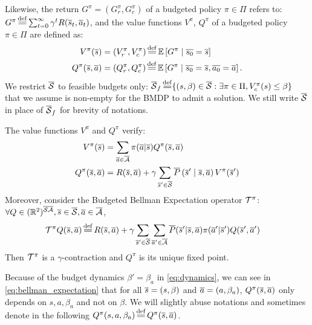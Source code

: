 Likewise, the return $G^\pi = (G_r^\pi, G_c^\pi)$ of a budgeted policy $\pi\in\Pi$ refers to:
$G^\pi \eqdef \sum_{t=0}^\infty \gamma^t R(\os_t, \oa_t)$,
and the value functions $V^\pi$, $Q^\pi$ of a budgeted policy $\pi\in\Pi$ are defined as:
\begin{align}
\label{eq:value-function}
V^\pi(\os) &= (V_r^\pi, V_c^\pi) \eqdef \expectedvalue\left[ G^\pi \condbar \ov{s_0} = \os\right]\\ Q^\pi(\os, \oa)&= (Q_r^\pi, Q_c^\pi) \eqdef \expectedvalue\left[ G^\pi \condbar \ov{s_0} = \os, \ov{a_0} = \oa\right].
\end{align}
We restrict $\overline{\mathcal{S}}$ to feasible budgets only: $\ocS_f \eqdef \{(s,\beta)\in\ocS: \exists \pi\in\Pi, V_c^\pi(s) \leq \beta\}$ that we assume is non-empty for the BMDP to admit a solution. We still write $\overline{\mathcal{S}}$ in place of $\overline{\mathcal{S}}_f$ for brevity of notations.

\begin{proposition}
	\begin{leftbar}[propositionbar]
	\label{prop:bellman-expectation}
	The value functions $V^\pi$ and $ Q^\pi$ verify:
	\begin{align}
	V^\pi(\overline{s}) &= \sum_{\overline{a}\in\overline{\mathcal{A}}}\pi(\overline{a} | \overline{s}) Q^\pi(\overline{s}, \overline{a}) \\ Q^\pi(\overline{s}, \overline{a}) &= R(\overline{s}, \overline{a}) + \gamma\sum_{\overline{s}'\in\overline{\mathcal{S}}}\overline{P}\left(\overline{s}' \;\middle|\; \overline{s}, \overline{a}\right) V^\pi(\overline{s}') \label{eq:bellman_expectation}
	\end{align}
	Moreover, consider the Budgeted Bellman Expectation operator $\mathcal{T}^\pi$:
	$\forall Q\in(\mathbb{R}^2)^{\overline{\mathcal{S}}\overline{\mathcal{A}}}, \overline{s}\in\overline{\mathcal{S}}, \overline{a}\in\overline{\mathcal{A}}$,
	\begin{align}
	\label{eq:bellman_expectation_operator}
	\cT^\pi Q(\os, \oa) &\eqdef R(\os, \oa) + \gamma \sum_{\os'\in\ocS}\sum_{\oa'\in\ocA}\ov{P}(\os'|\os, \oa)\pi(\oa'|\os') Q(\os', \oa')
	\end{align}
	Then $\mathcal{T}^\pi$ is a $\gamma$-contraction and $Q^\pi$ is its unique fixed point.
	\end{leftbar}
\end{proposition}

\begin{remark}
	Because of the budget dynamics $\beta' = \beta_a$ in \eqref{eq:dynamics}, we can see in \eqref{eq:bellman_expectation} that for all $\overline{s}=(s, \beta)$ and $\overline{a}=(a, \beta_a)$, $Q^\pi(\overline{s}, \overline{a})$ only depends on $s, a, \beta_a$ and not on $\beta$. We will slightly abuse notations and sometimes denote in the following $Q^\pi(s, a, \beta_a) \eqdef Q^\pi(\os, \oa)$.
\end{remark}

